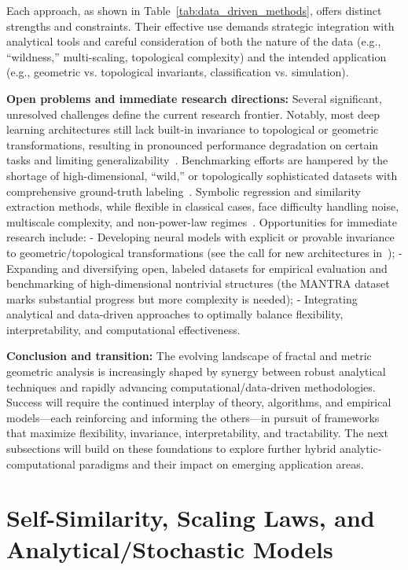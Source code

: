 \documentclass[sigconf]{acmart}
\begin{document}
Each approach, as shown in Table~\ref{tab:data_driven_methods}, offers distinct strengths and constraints. Their effective use demands strategic integration with analytical tools and careful consideration of both the nature of the data (e.g., ``wildness,'' multi-scaling, topological complexity) and the intended application (e.g., geometric vs. topological invariants, classification vs. simulation).

\textbf{Open problems and immediate research directions:} Several significant, unresolved challenges define the current research frontier. Notably, most deep learning architectures still lack built-in invariance to topological or geometric transformations, resulting in pronounced performance degradation on certain tasks and limiting generalizability~\cite{ref26,ref39}. Benchmarking efforts are hampered by the shortage of high-dimensional, ``wild,'' or topologically sophisticated datasets with comprehensive ground-truth labeling~\cite{ref26,ref39}. Symbolic regression and similarity extraction methods, while flexible in classical cases, face difficulty handling noise, multiscale complexity, and non-power-law regimes~\cite{ref65}. Opportunities for immediate research include:
- Developing neural models with explicit or provable invariance to geometric/topological transformations (see the call for new architectures in~\cite{ref26});
- Expanding and diversifying open, labeled datasets for empirical evaluation and benchmarking of high-dimensional nontrivial structures (the MANTRA dataset~\cite{ref26} marks substantial progress but more complexity is needed);
- Integrating analytical and data-driven approaches to optimally balance flexibility, interpretability, and computational effectiveness.

\textbf{Conclusion and transition:}
The evolving landscape of fractal and metric geometric analysis is increasingly shaped by synergy between robust analytical techniques and rapidly advancing computational/data-driven methodologies. Success will require the continued interplay of theory, algorithms, and empirical models—each reinforcing and informing the others—in pursuit of frameworks that maximize flexibility, invariance, interpretability, and tractability. The next subsections will build on these foundations to explore further hybrid analytic-computational paradigms and their impact on emerging application areas.

\section{Self-Similarity, Scaling Laws, and Analytical/Stochastic Models}
\end{document}
